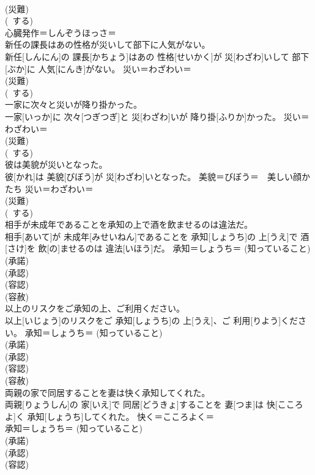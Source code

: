 \documentclass[8pt]{extreport}
\begin{document}
\begin{CJK}{UTF8}{min}
\\	(災難) 
\\	(~する) 
\\	心臓発作＝しんぞうほっさ＝ 
\\	新任の課長はあの性格が災いして部下に人気がない。	
\\	新任[しんにん]の 課長[かちょう]はあの 性格[せいかく]が 災[わざわ]いして 部下[ぶか]に 人気[にんき]がない。	災い＝わざわい＝ 
\\	(災難) 
\\	(~する) 
\\	一家に次々と災いが降り掛かった。	
\\	一家[いっか]に 次々[つぎつぎ]と 災[わざわ]いが 降り掛[ふりか]かった。	災い＝わざわい＝ 
\\	(災難) 
\\	(~する) 
\\	彼は美貌が災いとなった。	
\\	彼[かれ]は 美貌[びぼう]が 災[わざわ]いとなった。	美貌＝びぼう＝　美しい顔かたち 災い＝わざわい＝ 
\\	(災難) 
\\	(~する) 
\\	相手が未成年であることを承知の上で酒を飲ませるのは違法だ。	
\\	相手[あいて]が 未成年[みせいねん]であることを 承知[しょうち]の 上[うえ]で 酒[さけ]を 飲[の]ませるのは 違法[いほう]だ。	承知＝しょうち＝ (知っていること) 
\\	(承諾) 
\\	(承認) 
\\	(容認) 
\\	(容赦)
\\	以上のリスクをご承知の上、ご利用ください。	
\\	以上[いじょう]のリスクをご 承知[しょうち]の 上[うえ]、ご 利用[りよう]ください。	承知＝しょうち＝ (知っていること) 
\\	(承諾) 
\\	(承認) 
\\	(容認) 
\\	(容赦)
\\	両親の家で同居することを妻は快く承知してくれた。	
\\	両親[りょうしん]の 家[いえ]で 同居[どうきょ]することを 妻[つま]は 快[こころよ]く 承知[しょうち]してくれた。	快く＝こころよく＝ 
\\	承知＝しょうち＝ (知っていること) 
\\	(承諾) 
\\	(承認) 
\\	(容認) 

\end{CJK}
\end{document}
